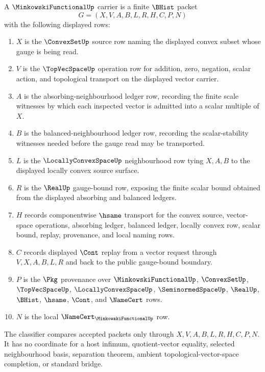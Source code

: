 \begin{definition}
\label{def:minkowski-functional-carrier}
A $\MinkowskiFunctionalUp$ carrier is a finite $\BHist$ packet
$$
G=(X,V,A,B,L,R,H,C,P,N)
$$
with the following displayed rows:
\begin{enumerate}
\item $X$ is the $\ConvexSetUp$ source row naming the displayed convex subset whose gauge is being read.
\item $V$ is the $\TopVecSpaceUp$ operation row for addition, zero, negation, scalar action, and topological transport on the displayed vector carrier.
\item $A$ is the absorbing-neighbourhood ledger row, recording the finite scale witnesses by which each inspected vector is admitted into a scalar multiple of $X$.
\item $B$ is the balanced-neighbourhood ledger row, recording the scalar-stability witnesses needed before the gauge read may be transported.
\item $L$ is the $\LocallyConvexSpaceUp$ neighbourhood row tying $X,A,B$ to the displayed locally convex source surface.
\item $R$ is the $\RealUp$ gauge-bound row, exposing the finite scalar bound obtained from the displayed absorbing and balanced ledgers.
\item $H$ records componentwise $\hsame$ transport for the convex source, vector-space operations, absorbing ledger, balanced ledger, locally convex row, scalar bound, replay, provenance, and local naming rows.
\item $C$ records displayed $\Cont$ replay from a vector request through $V,X,A,B,L,R$ and back to the public gauge-bound boundary.
\item $P$ is the $\Pkg$ provenance over $\MinkowskiFunctionalUp$, $\ConvexSetUp$, $\TopVecSpaceUp$, $\LocallyConvexSpaceUp$, $\SeminormedSpaceUp$, $\RealUp$, $\BHist$, $\hsame$, $\Cont$, and $\NameCert$ rows.
\item $N$ is the local $\NameCert_{\MinkowskiFunctionalUp}$ row.
\end{enumerate}
The classifier compares accepted packets only through $X,V,A,B,L,R,H,C,P,N$. It has no coordinate for a host infimum, quotient-vector equality, selected neighbourhood basis, separation theorem, ambient topological-vector-space completion, or standard bridge.
\end{definition}

